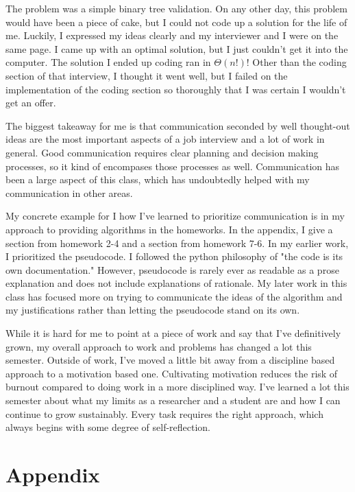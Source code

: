 \documentclass{article}
\begin{document}
The problem was a simple binary tree validation. On any other day, this problem would have been a piece of cake, but I could not code up a solution for the life of me. Luckily, I expressed my ideas clearly and my interviewer and I were on the same page. I came up with an optimal solution, but I just couldn't get it into the computer. The solution I ended up coding ran in $\Theta(n!)$! Other than the coding section of that interview, I thought it went well, but I failed on the implementation of the coding section so thoroughly that I was certain I wouldn't get an offer.

The biggest takeaway for me is that communication seconded by well thought-out ideas are the most important aspects of a job interview and a lot of work in general. Good communication requires clear planning and decision making processes, so it kind of encompases those processes as well. Communication has been a large aspect of this class, which has undoubtedly helped with my communication in other areas.

My concrete example for I how I've learned to prioritize communication is in my approach to providing algorithms in the homeworks. In the appendix, I give a section from homework 2-4 and a section from homework 7-6. In my earlier work, I prioritized the pseudocode. I followed the python philosophy of "the code is its own documentation." However, pseudocode is rarely ever as readable as a prose explanation and does not include explanations of rationale. My later work in this class has focused more on trying to communicate the ideas of the algorithm and my justifications rather than letting the pseudocode stand on its own.

While it is hard for me to point at a piece of work and say that I've definitively grown, my overall approach to work and problems has changed a lot this semester. Outside of work, I've moved a little bit away from a discipline based approach to a motivation based one. Cultivating motivation reduces the risk of burnout compared to doing work in a more disciplined way. I've learned a lot this semester about what my limits as a researcher and a student are and how I can continue to grow sustainably. Every task requires the right approach, which always begins with some degree of self-reflection.

\pagebreak
\section*{Appendix}
\end{document}
